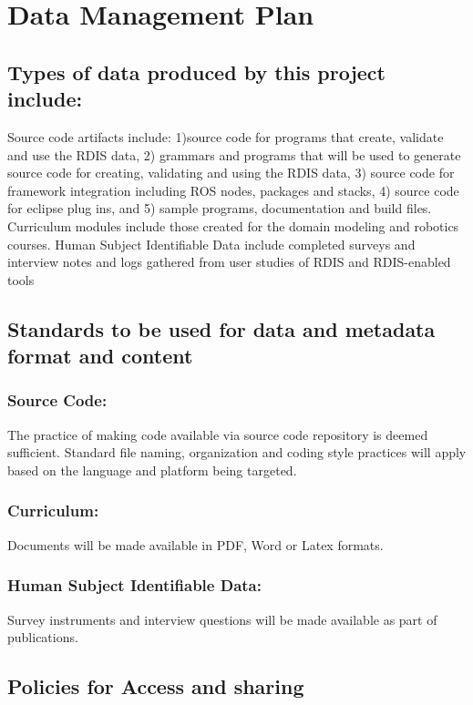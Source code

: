 
\section*{Data Management Plan}


\subsection*{Types of data produced by this project include:}

Source code artifacts include: 1)source code for programs that create, validate and use the RDIS data, 2) grammars and programs that will be used to generate source code for creating, validating and using the RDIS data, 3) source code for framework integration including ROS nodes, packages and stacks, 4) source code for eclipse plug ins, and 5) sample programs, documentation and build files.  Curriculum modules include those created for the domain modeling and robotics courses.  Human Subject Identifiable Data include completed surveys and interview notes and logs gathered from user studies of RDIS and RDIS-enabled tools 

\subsection*{Standards to be used for data and metadata format and content }

\subsubsection*{Source Code:}  The practice of making code available via source code repository is deemed sufficient.  Standard file naming, organization and coding style practices will apply based on the language and platform being targeted.

\subsubsection*{Curriculum: } Documents will be made available in PDF, Word or Latex formats.

\subsubsection*{ Human Subject Identifiable Data:}Survey instruments and interview questions will be made available as part of publications.

\subsection*{Policies for Access and sharing}

